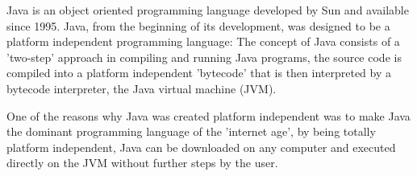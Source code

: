 Java is an object oriented programming language developed by Sun and available since 1995. Java, from the beginning of its development, was designed to be a platform independent programming language: The concept of Java consists of a 'two-step' approach in compiling and running Java programs, the source code is compiled into a platform independent 'bytecode' that is then interpreted by a bytecode interpreter, the Java virtual machine (JVM).

One of the reasons why Java was created platform independent was to make Java the dominant programming language of the 'internet age', by being totally platform independent, Java can be downloaded on any computer and executed directly on the JVM without further steps by the user.